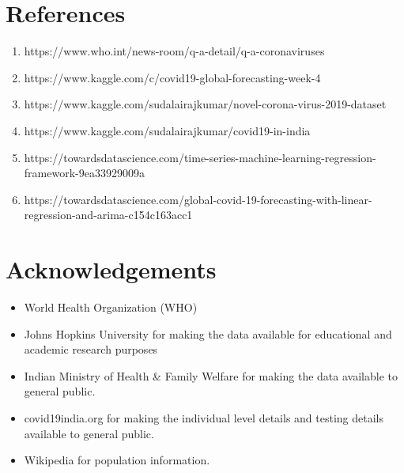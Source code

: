 \documentclass{article}
\begin{document}
\section*{References}
\begin{enumerate}
    \item https://www.who.int/news-room/q-a-detail/q-a-coronaviruses
    
    \item https://www.kaggle.com/c/covid19-global-forecasting-week-4
    
    \item https://www.kaggle.com/sudalairajkumar/novel-corona-virus-2019-dataset
    
    \item https://www.kaggle.com/sudalairajkumar/covid19-in-india
    \item https://towardsdatascience.com/time-series-machine-learning-regression-framework-9ea33929009a
    \item https://towardsdatascience.com/global-covid-19-forecasting-with-linear-regression-and-arima-c154c163acc1
\end{enumerate}
\clearpage
\section*{Acknowledgements}
\begin{itemize}
\item
World Health Organization (WHO)
\item
Johns Hopkins University for making the data available for educational and academic research purposes
\item
Indian Ministry of Health \& Family Welfare for making the data available to general public.
\item
covid19india.org for making the individual level details and testing details available to general public.
\item
Wikipedia for population information.
\end{itemize}
\end{document}
